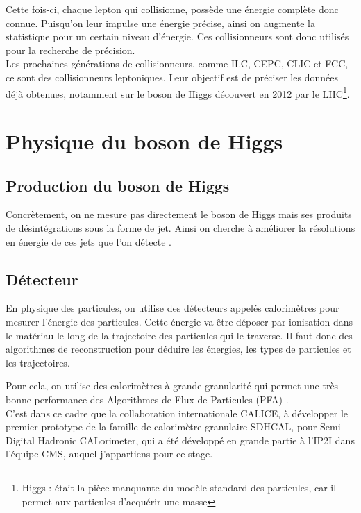 Cette fois-ci, chaque lepton qui collisionne, possède une énergie complète donc connue. 
Puisqu'on leur impulse une énergie précise, ainsi on augmente la statistique pour un certain niveau d'énergie.
Ces collisionneurs sont donc utilisés pour la recherche de précision.\\

Les prochaines générations de collisionneurs, comme ILC, CEPC, CLIC et FCC, ce sont des collisionneurs leptoniques. 
Leur objectif est de préciser les données déjà obtenues, notamment sur le boson de Higgs découvert en 2012 par le LHC\footnote{Higgs : était la pièce manquante du modèle standard des particules, car il permet aux particules d'acquérir une masse}.

\section{Physique du boson de Higgs}

\subsection{Production du boson de Higgs}

Concrètement, on ne mesure pas directement le boson de Higgs mais ses produits de désintégrations sous la forme de jet.
Ainsi on cherche à améliorer la résolutions en énergie de ces jets que l'on détecte \cite{liu:tel-03405418}.

\subsection{Détecteur}

En physique des particules, on utilise des détecteurs appelés calorimètres pour mesurer l'énergie des particules. 
Cette énergie va être déposer par ionisation dans le matériau le long de la trajectoire des particules qui le traverse. 
Il faut donc des algorithmes de reconstruction pour déduire les énergies, les types de particules et les trajectoires.

Pour cela, on utilise des calorimètres à grande granularité qui permet une très bonne performance des Algorithmes de Flux de Particules (PFA) \cite{liu:tel-03405418}. \\

C'est dans ce cadre que la collaboration internationale CALICE, à développer le premier prototype de la famille de calorimètre granulaire SDHCAL, pour Semi-Digital Hadronic CALorimeter, qui a été développé en grande partie à l'IP2I dans l'équipe CMS, auquel j'appartiens pour ce stage.

